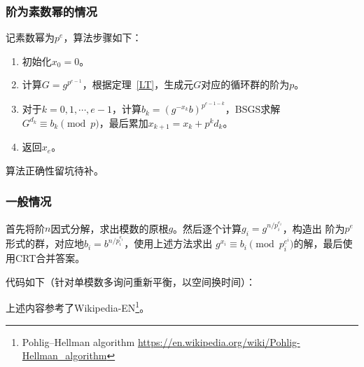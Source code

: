 \subsubsection{阶为素数幂的情况}

记素数幂为$p^e$，算法步骤如下：

\begin{enumerate}
    \item 初始化$x_0=0$。
    \item 计算$G=g^{p^{e-1}}$，根据定理~\ref{LT}，生成元$G$对应的循环群的阶为$p$。
    \item 对于$k=0,1,\cdots,e-1$，计算$b_k=(g^{-x_k}b)^{p^{e-1-k}}$，BSGS求解
    $G^{d_k}\equiv b_k\pmod{p}$，最后累加$x_{k+1}=x_k+p^kd_k$。
    \item 返回$x_e$。
\end{enumerate}

算法正确性留坑待补。

\subsubsection{一般情况}
首先将阶$n$因式分解，求出模数的原根$g$。然后逐个计算$g_i=g^{n/p_i^{e_i}}$，构造出
阶为$p^e$形式的群，对应地$b_i=b^{n/p_i^{e_i}}$，使用上述方法求出
$g^{x_i}\equiv b_i\pmod{p_i^{e^i}}$的解，最后使用CRT合并答案。

代码如下（针对单模数多询问重新平衡，以空间换时间）：


上述内容参考了Wikipedia-EN\footnote{
    Pohlig–Hellman algorithm
    \url{https://en.wikipedia.org/wiki/Pohlig-Hellman\_algorithm}
}。

